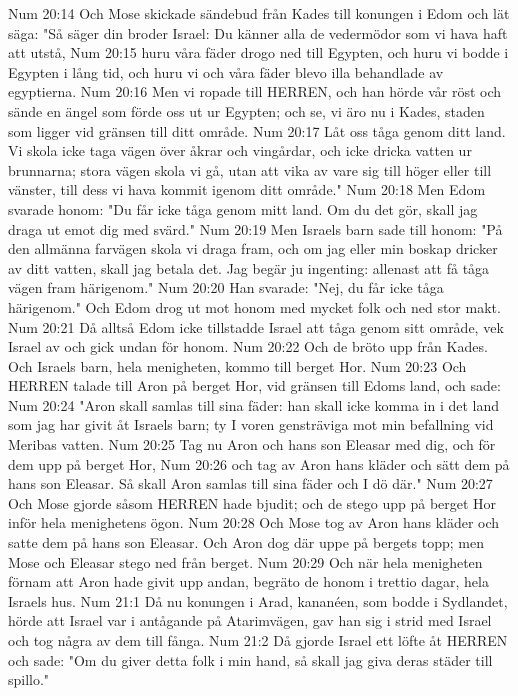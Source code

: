 Num 20:14  Och Mose skickade sändebud från Kades till konungen i Edom och lät säga: "Så säger din broder Israel: Du känner alla de vedermödor som vi hava haft att utstå,
Num 20:15  huru våra fäder drogo ned till Egypten, och huru vi bodde i Egypten i lång tid, och huru vi och våra fäder blevo illa behandlade av egyptierna.
Num 20:16  Men vi ropade till HERREN, och han hörde vår röst och sände en ängel som förde oss ut ur Egypten; och se, vi äro nu i Kades, staden som ligger vid gränsen till ditt område.
Num 20:17  Låt oss tåga genom ditt land. Vi skola icke taga vägen över åkrar och vingårdar, och icke dricka vatten ur brunnarna; stora vägen skola vi gå, utan att vika av vare sig till höger eller till vänster, till dess vi hava kommit igenom ditt område."
Num 20:18  Men Edom svarade honom: "Du får icke tåga genom mitt land. Om du det gör, skall jag draga ut emot dig med svärd."
Num 20:19  Men Israels barn sade till honom: "På den allmänna farvägen skola vi draga fram, och om jag eller min boskap dricker av ditt vatten, skall jag betala det. Jag begär ju ingenting: allenast att få tåga vägen fram härigenom."
Num 20:20  Han svarade: "Nej, du får icke tåga härigenom." Och Edom drog ut mot honom med mycket folk och ned stor makt.
Num 20:21  Då alltså Edom icke tillstadde Israel att tåga genom sitt område, vek Israel av och gick undan för honom.
Num 20:22  Och de bröto upp från Kades. Och Israels barn, hela menigheten, kommo till berget Hor.
Num 20:23  Och HERREN talade till Aron på berget Hor, vid gränsen till Edoms land, och sade:
Num 20:24  "Aron skall samlas till sina fäder: han skall icke komma in i det land som jag har givit åt Israels barn; ty I voren gensträviga mot min befallning vid Meribas vatten.
Num 20:25  Tag nu Aron och hans son Eleasar med dig, och för dem upp på berget Hor,
Num 20:26  och tag av Aron hans kläder och sätt dem på hans son Eleasar. Så skall Aron samlas till sina fäder och I dö där."
Num 20:27  Och Mose gjorde såsom HERREN hade bjudit; och de stego upp på berget Hor inför hela menighetens ögon.
Num 20:28  Och Mose tog av Aron hans kläder och satte dem på hans son Eleasar. Och Aron dog där uppe på bergets topp; men Mose och Eleasar stego ned från berget.
Num 20:29  Och när hela menigheten förnam att Aron hade givit upp andan, begräto de honom i trettio dagar, hela Israels hus.
Num 21:1  Då nu konungen i Arad, kananéen, som bodde i Sydlandet, hörde att Israel var i antågande på Atarimvägen, gav han sig i strid med Israel och tog några av dem till fånga.
Num 21:2  Då gjorde Israel ett löfte åt HERREN och sade: "Om du giver detta folk i min hand, så skall jag giva deras städer till spillo."
